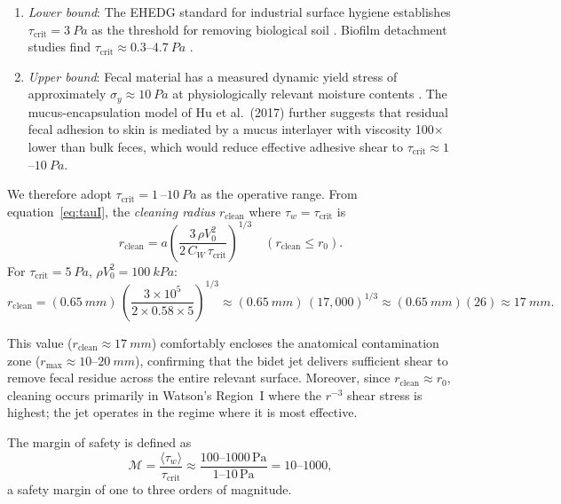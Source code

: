\documentclass[aps,prfluids,reprint,amsmath,amssymb,floatfix]{revtex4-2}
\begin{document}
\begin{enumerate}[leftmargin=*, label=(\roman*)]
    \item \emph{Lower bound}: The EHEDG standard for industrial surface
    hygiene establishes $\tau_\mathrm{crit} = \SI{3}{Pa}$ as the threshold
    for removing biological soil \citep{Ehedg2003}. Biofilm detachment
    studies find $\tau_\mathrm{crit} \approx 0.3$--$\SI{4.7}{Pa}$
    \citep{Teodosio2010}.
    \item \emph{Upper bound}: Fecal material has a measured dynamic yield
    stress of approximately $\sigma_y \approx \SI{10}{Pa}$ at physiologically
    relevant moisture contents \citep{Woolley2014}. The mucus-encapsulation
    model of Hu et al.\ (2017) further suggests that residual fecal adhesion
    to skin is mediated by a mucus interlayer with viscosity 100$\times$ lower
    than bulk feces, which would reduce effective adhesive shear to
    $\tau_\mathrm{crit} \approx 1$--$\SI{10}{Pa}$.
\end{enumerate}

We therefore adopt $\tau_\mathrm{crit} = \SI{1}{}$--$\SI{10}{Pa}$ as
the operative range. From equation~\eqref{eq:tauI}, the \emph{cleaning
radius} $r_\mathrm{clean}$ where $\tau_w = \tau_\mathrm{crit}$ is
\begin{equation}
    r_\mathrm{clean} = a \left(\frac{3\,\rho V_0^2}{2\,C_W\,\tau_\mathrm{crit}}\right)^{1/3}
    \quad (r_\mathrm{clean} \leq r_0).
    \label{eq:rclean}
\end{equation}
For $\tau_\mathrm{crit} = \SI{5}{Pa}$, $\rho V_0^2 = \SI{100}{kPa}$:
\begin{equation}
    r_\mathrm{clean} = (\SI{0.65}{mm})\,\left(\frac{3 \times 10^5}{2 \times 0.58 \times 5}\right)^{1/3}
    \approx (\SI{0.65}{mm})\,(17{,}000)^{1/3}
    \approx (\SI{0.65}{mm})(26) \approx \SI{17}{mm}.
    \label{eq:rcleanval}
\end{equation}

This value ($r_\mathrm{clean} \approx \SI{17}{mm}$) comfortably encloses the
anatomical contamination zone ($r_\mathrm{max} \approx 10$--$\SI{20}{mm}$),
confirming that the bidet jet delivers sufficient shear to remove fecal
residue across the entire relevant surface. Moreover, since
$r_\mathrm{clean} \approx r_0$, cleaning occurs primarily in Watson's
Region~I where the $r^{-3}$ shear stress is highest; the jet operates
in the regime where it is most effective.

The margin of safety is defined as
\begin{equation}
    \mathcal{M} = \frac{\langle\tau_w\rangle}{\tau_\mathrm{crit}} \approx
    \frac{100\text{--}1000\,\mathrm{Pa}}{1\text{--}10\,\mathrm{Pa}} = 10\text{--}1000,
    \label{eq:margin}
\end{equation}
a safety margin of one to three orders of magnitude.
\end{document}
